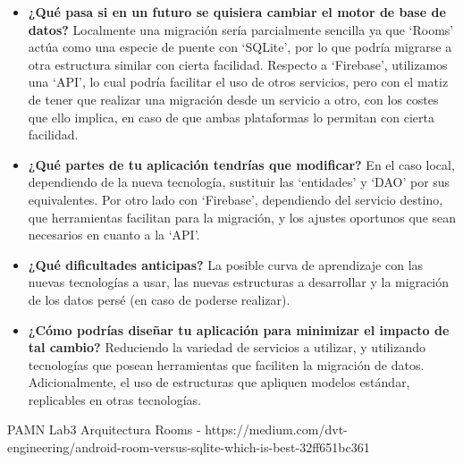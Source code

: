 \documentclass{article}
\begin{document}
    \begin{itemize}
        \item \textbf{¿Qué pasa si en un futuro se quisiera cambiar el motor de base de datos?}
        Localmente una migración sería parcialmente sencilla ya que \enquote*{Rooms}
         actúa como una especie de puente con \enquote*{SQLite}, por lo que podría migrarse
         a otra estructura similar con cierta facilidad. Respecto a \enquote*{Firebase}, utilizamos
         una \enquote*{API}, lo cual podría facilitar el uso de otros servicios, pero con el matiz
         de tener que realizar una migración desde un servicio a otro, con los costes que ello
         implica, en caso de que ambas plataformas lo permitan con cierta facilidad.
        \item \textbf{¿Qué partes de tu aplicación tendrías que modificar?}
        En el caso local, dependiendo de la nueva tecnología, sustituir las \enquote*{entidades} y
         \enquote*{DAO} por sus equivalentes. Por otro lado con \enquote*{Firebase}, dependiendo
         del servicio destino, que herramientas facilitan para la migración, y los ajustes
         oportunos que sean necesarios en cuanto a la \enquote*{API}.
        \item \textbf{¿Qué dificultades anticipas?}
        La posible curva de aprendizaje con las nuevas tecnologías a usar, las nuevas estructuras a
         desarrollar y la migración de los datos persé (en caso de poderse realizar).
        \item \textbf{¿Cómo podrías diseñar tu aplicación para minimizar el impacto de tal cambio?}
        Reduciendo la variedad de servicios a utilizar, y utilizando tecnologías que posean herramientas
         que faciliten la migración de datos. Adicionalmente, el uso de estructuras que apliquen modelos
         estándar, replicables en otras tecnologías.
    \end{itemize}

    \begin{thebibliography}{}
         PAMN Lab3 Arquitectura
         Rooms - https://medium.com/dvt-engineering/android-room-versus-sqlite-which-is-best-32ff651bc361
    \end{thebibliography}
        
\end{document}

